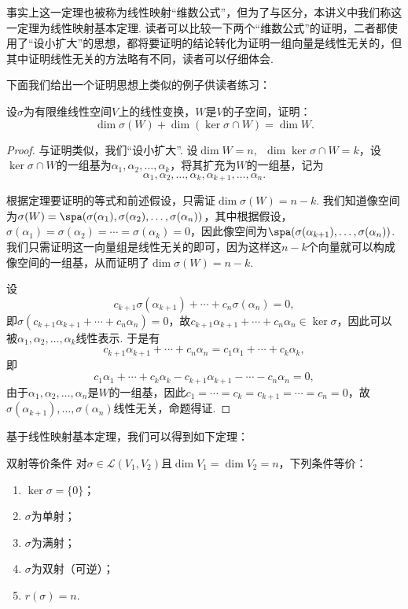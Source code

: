 事实上这一定理也被称为线性映射``维数公式''，但为了与区分，本讲义中我们称这一定理为线性映射基本定理. 读者可以比较一下两个``维数公式''的证明，二者都使用了``设小扩大''的思想，都将要证明的结论转化为证明一组向量是线性无关的，但其中证明线性无关的方法略有不同，读者可以仔细体会.

下面我们给出一个证明思想上类似的例子供读者练习：
\begin{example}{}{}
    设$\sigma$为有限维线性空间$V$上的线性变换，$W$是$V$的子空间，证明：
    \[\dim\sigma(W)+\dim(\ker\sigma \cap W)=\dim W.\]
\end{example}

\begin{proof}
    与证明类似，我们``设小扩大''. 设$\dim W=n,\enspace\dim\ker\sigma\cap W=k$，设$\ker\sigma\cap W$的一组基为$\alpha_1,\alpha_2,\ldots,\alpha_k$，将其扩充为$W$的一组基，记为
    \[\alpha_1,\alpha_2,\ldots,\alpha_k,\alpha_{k+1},\ldots,\alpha_n.\]

    根据定理要证明的等式和前述假设，只需证$\dim\sigma(W)=n-k$. 我们知道像空间为$\sigma(W)=\spa(\sigma(\alpha_1),\sigma(\alpha_2),\ldots,\sigma(\alpha_n))$，其中根据假设，$\sigma(\alpha_1)=\sigma(\alpha_2)=\cdots=\sigma(\alpha_k)=0$，因此像空间为$\spa(\sigma(\alpha_{k+1}),\ldots,\sigma(\alpha_n))$. 我们只需证明这一向量组是线性无关的即可，因为这样这$n-k$个向量就可以构成像空间的一组基，从而证明了$\dim\sigma(W)=n-k$.

    设
    \[c_{k+1}\sigma(\alpha_{k+1})+\cdots+c_n\sigma(\alpha_n)=0,\]
    即$\sigma(c_{k+1}\alpha_{k+1}+\cdots+c_n\alpha_n)=0$，故$c_{k+1}\alpha_{k+1}+\cdots+c_n\alpha_n\in\ker\sigma$，因此可以被$\alpha_1,\alpha_2,\ldots,\alpha_k$线性表示. 于是有
    \[c_{k+1}\alpha_{k+1}+\cdots+c_n\alpha_n=c_1\alpha_1+\cdots+c_k\alpha_k,\]
    即
    \[c_1\alpha_1+\cdots+c_k\alpha_k-c_{k+1}\alpha_{k+1}-\cdots-c_n\alpha_n=0,\]
    由于$\alpha_1,\alpha_2,\ldots,\alpha_n$是$W$的一组基，因此$c_1=\cdots=c_k=c_{k+1}=\cdots=c_n=0$，故$\sigma(\alpha_{k+1}),\ldots,\sigma(\alpha_n)$线性无关，命题得证.
\end{proof}

基于线性映射基本定理，我们可以得到如下定理：
\begin{theorem}{}{双射等价条件}
    对$\sigma \in \mathcal{L}(V_1,V_2)$且$\dim V_1=\dim V_2=n$，下列条件等价：
    \begin{enumerate}
        \item \label{item:6:双射等价条件:1}
              $\ker \sigma=\{0\}$；

        \item \label{item:6:双射等价条件:2}
              $\sigma$为单射；

        \item $\sigma$为满射；

        \item $\sigma$为双射（可逆）；

        \item $r(\sigma)=n$.
    \end{enumerate}
\end{theorem}

